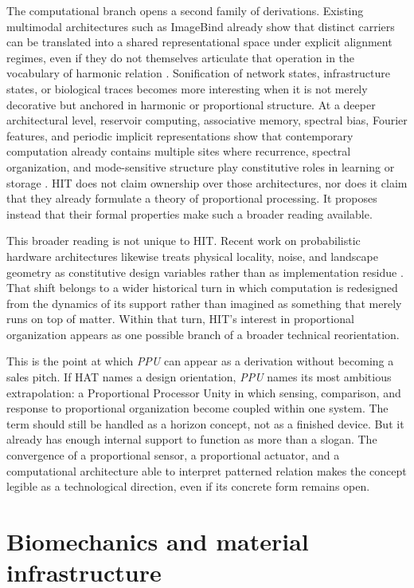 The computational branch opens a second family of derivations. Existing multimodal architectures such as ImageBind already show that distinct carriers can be translated into a shared representational space under explicit alignment regimes, even if they do not themselves articulate that operation in the vocabulary of harmonic relation \parencite{girdhar_2023}. Sonification of network states, infrastructure states, or biological traces becomes more interesting when it is not merely decorative but anchored in harmonic or proportional structure. At a deeper architectural level, reservoir computing, associative memory, spectral bias, Fourier features, and periodic implicit representations show that contemporary computation already contains multiple sites where recurrence, spectral organization, and mode-sensitive structure play constitutive roles in learning or storage \parencite{jaeger_2001,ramsauer_2021,rahaman_2019,tancik_2020,sitzmann_2020}. HIT does not claim ownership over those architectures, nor does it claim that they already formulate a theory of proportional processing. It proposes instead that their formal properties make such a broader reading available.

This broader reading is not unique to HIT. Recent work on probabilistic hardware architectures likewise treats physical locality, noise, and landscape geometry as constitutive design variables rather than as implementation residue \parencite{jelincic_2025}. That shift belongs to a wider historical turn in which computation is redesigned from the dynamics of its support rather than imagined as something that merely runs on top of matter. Within that turn, HIT's interest in proportional organization appears as one possible branch of a broader technical reorientation.

This is the point at which \emph{PPU} can appear as a derivation without becoming a sales pitch. If HAT names a design orientation, \emph{PPU} names its most ambitious extrapolation: a Proportional Processor Unity in which sensing, comparison, and response to proportional organization become coupled within one system. The term should still be handled as a horizon concept, not as a finished device. But it already has enough internal support to function as more than a slogan. The convergence of a proportional sensor, a proportional actuator, and a computational architecture able to interpret patterned relation makes the concept legible as a technological direction, even if its concrete form remains open.


\section{Biomechanics and material infrastructure}


